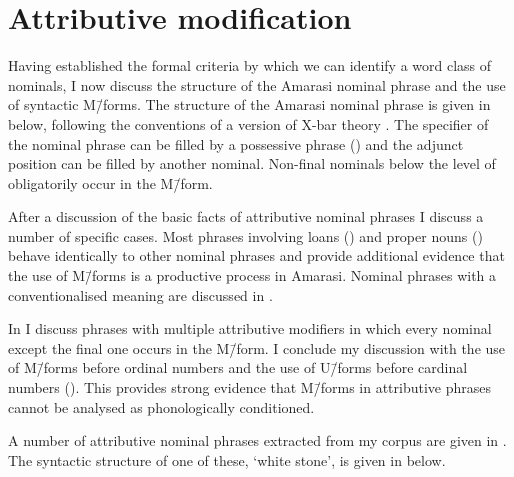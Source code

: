 \section{Attributive modification}\label{sec:AttMod}
Having established the formal criteria by which we can identify a word class of nominals,
I now discuss the structure of the Amarasi nominal phrase and the use of syntactic M\=/forms.
The structure of the Amarasi nominal phrase is given in  below,
following the conventions of a version of X-bar theory \citep{br16}.
The specifier of the nominal phrase can be filled by a possessive phrase ()
and the adjunct position can be filled by another nominal.
Non-final nominals below the level of  obligatorily occur in the M\=/form.

\begin{exe}
	\label{tr:NouPhr}
\end{exe}

After a discussion of the basic facts of attributive nominal phrases
I discuss a number of specific cases.
Most phrases involving loans ()
and proper nouns ()
behave identically to other nominal phrases
and provide additional evidence that the use of M\=/forms
is a productive process in Amarasi.
Nominal phrases with a conventionalised meaning
are discussed in .

In  I discuss phrases with
multiple attributive modifiers in which every
nominal except the final one occurs in the M\=/form.
I conclude my discussion with the use of M\=/forms before ordinal numbers
and the use of U\=/forms before cardinal numbers ().
This provides strong evidence that M\=/forms
in attributive phrases cannot be analysed as phonologically conditioned.

A number of attributive nominal phrases extracted from my corpus
are given in .
The syntactic structure of one of these,
 `white stone', is given in  below.

